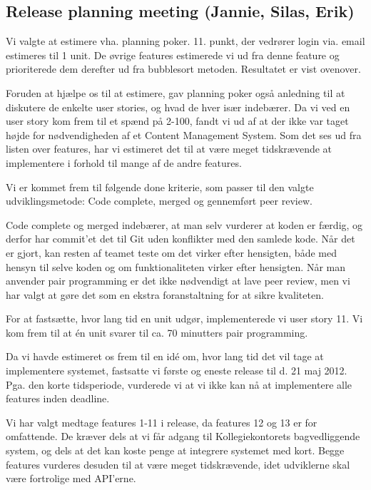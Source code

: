 \documentclass[12pt, a4paper]{report}
\begin{document}
\subsection{Release planning meeting (Jannie, Silas, Erik)}

Vi valgte at estimere vha. planning poker. 11. punkt, der vedrører login via. email estimeres til 1 unit. De øvrige features estimerede vi  ud fra denne feature og prioriterede dem derefter ud fra bubblesort metoden. Resultatet er vist ovenover.

Foruden at hjælpe os til at estimere, gav planning poker også anledning til at diskutere de enkelte user stories, og hvad de hver især indebærer. Da vi ved en user story kom frem til et spænd på 2-100, fandt vi ud af at der ikke var taget højde for nødvendigheden af et Content Management System. Som det ses ud fra listen over features, har vi estimeret det til at være meget tidskrævende at implementere i forhold til mange af de andre features.

Vi er kommet frem til følgende done kriterie, som passer til den valgte udviklingsmetode: Code complete, merged og gennemført peer review.

Code complete og merged indebærer, at man selv vurderer at koden er færdig, og derfor har commit’et det til Git uden konflikter med den samlede kode. Når det er gjort, kan resten af teamet teste om det virker efter hensigten, både med hensyn til selve koden og om funktionaliteten virker efter hensigten. Når man anvender pair programming er det ikke nødvendigt at lave peer review, men vi har valgt at gøre det som en ekstra foranstaltning for at sikre kvaliteten.

For at fastsætte, hvor lang tid en unit udgør, implementerede vi user story 11. Vi kom frem til at én unit svarer til ca. 70 minutters pair programming.

Da vi havde estimeret os frem til en idé om, hvor lang tid det vil tage at implementere systemet, fastsatte vi første og eneste release til d. 21 maj 2012. Pga. den korte tidsperiode, vurderede vi at vi ikke kan nå at implementere alle features inden deadline.

Vi har valgt medtage features 1-11 i release, da features 12 og 13 er for omfattende. De kræver dels at vi får adgang til Kollegiekontorets bagvedliggende system, og dels at det kan koste penge at integrere systemet med kort. Begge features vurderes desuden til at være meget tidskrævende, idet udviklerne skal være fortrolige med API’erne.
\end{document}
